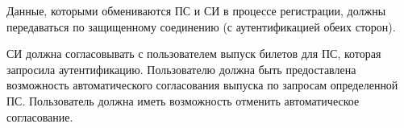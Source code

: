 
Данные, которыми обмениваются ПС и СИ в процессе регистрации, 
должны передаваться по защищенному соединению (с аутентификацией обеих сторон).


СИ должна согласовывать с пользователем выпуск билетов для ПС, которая 
запросила аутентификацию. 
%
Пользователю должна быть предоставлена возможность автоматического согласования 
выпуска по запросам определенной ПС.
%
Пользователь должна иметь возможность отменить автоматическое согласование.

% 
% 
